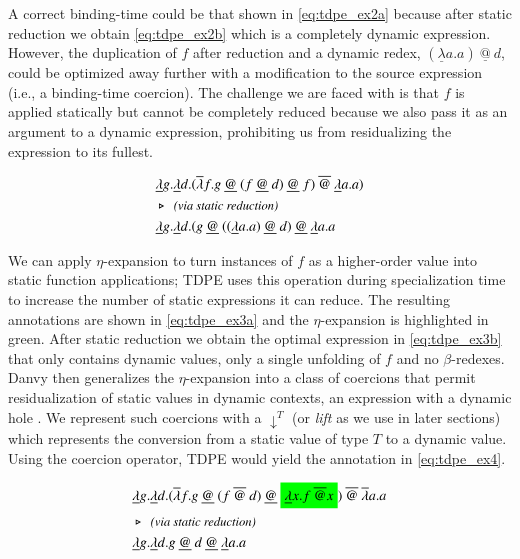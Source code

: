 \documentclass[a4paper,12pt,twoside,openright]{report}
\theoremstyle{definition}
\begin{document}
A correct binding-time could be that shown in \eqref{eq:tdpe_ex2a} because after static reduction we obtain \eqref{eq:tdpe_ex2b} which is a completely dynamic expression. However, the duplication of $f$ after reduction and a dynamic redex, $(\underline{\lambda}a.a) \: \underline{@} \: d$, could be optimized away further with a modification to the source expression (i.e., a binding-time coercion). The challenge we are faced with is that $f$ is applied statically but cannot be completely reduced because we also pass it as an argument to a dynamic expression, prohibiting us from residualizing the expression to its fullest.
\begin{figure}[h]
    \begin{align}
        & \underline{\lambda}g.\underline{\lambda} d.(\overline{\lambda} f.g \: \underline{@} \: (f \: \underline{@} \: d) \: \underline{@} \: f) \: \overline{@} \: \underline{\lambda} a.a) \label{eq:tdpe_ex2a} \\
        & \triangleright \:\: \emph{\small{\text{(via static reduction)}}} \nonumber \\
        & \underline{\lambda}g.\underline{\lambda} d.(g \: \underline{@} \: ((\underline{\lambda} a.a) \: \underline{@} \: d) \: \underline{@} \: \underline{\lambda} a.a \label{eq:tdpe_ex2b}
    \end{align}
\end{figure}

We can apply $\eta$-expansion to turn instances of $f$ as a higher-order value into static function applications; TDPE uses this operation during specialization time to increase the number of static expressions it can reduce. The resulting annotations are shown in \eqref{eq:tdpe_ex3a} and the $\eta$-expansion is highlighted in green. After static reduction we obtain the optimal expression in \eqref{eq:tdpe_ex3b} that only contains dynamic values, only a single unfolding of $f$ and no $\beta$-redexes. Danvy then generalizes the $\eta$-expansion into a class of coercions that permit residualization of static values in dynamic contexts, an expression with a dynamic hole \cite{danvy1995essence}. We represent such coercions with a $\downarrow^T$ (or \textit{lift} as we use in later sections) which represents the conversion from a static value of type $T$ to a dynamic value. Using the coercion operator, TDPE would yield the annotation in \eqref{eq:tdpe_ex4}.

\begin{figure}[h]
    \begin{align}
        & \underline{\lambda}g.\underline{\lambda} d.(\overline{\lambda}f.g \: \underline{@} \: (f \: \overline{@} \: d) \: \underline{@} \: \text{\colorbox{green}{$\underline{\lambda} x.f \: \overline{@} x$}}) \: \overline{@} \: \overline{\lambda} a.a \label{eq:tdpe_ex3a} \\
        & \triangleright \:\: \emph{\small{\text{(via static reduction)}}} \nonumber \\
        & \underline{\lambda}g.\underline{\lambda} d.g \: \underline{@} \: d \: \underline{@} \: \underline{\lambda} a.a \label{eq:tdpe_ex3b}
    \end{align}
\end{figure}
\end{document}
